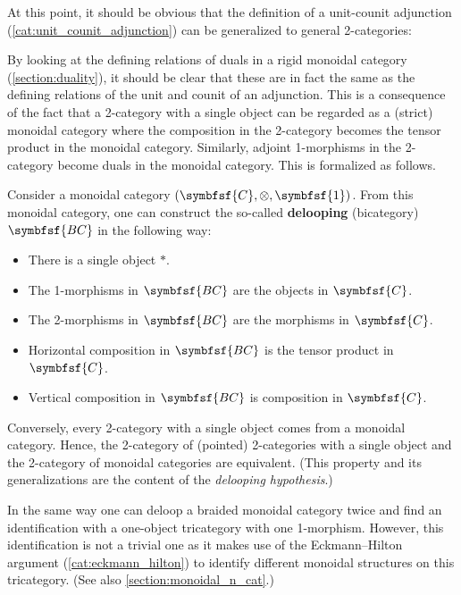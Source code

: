     At this point, it should be obvious that the definition of a unit-counit adjunction (\cref{cat:unit_counit_adjunction}) can be generalized to general 2-categories:

    By looking at the defining relations of duals in a rigid monoidal category (\cref{section:duality}), it should be clear that these are in fact the same as the defining relations of the unit and counit of an adjunction. This is a consequence of the fact that a 2-category with a single object can be regarded as a (strict) monoidal category where the composition in the 2-category becomes the tensor product in the monoidal category. Similarly, adjoint 1-morphisms in the 2-category become duals in the monoidal category. This is formalized as follows.
    \begin{property}\label{cat:monoidal_or_2}
        Consider a monoidal category $(\symbfsf{C},\otimes,\symbfsf{1})$. From this monoidal category, one can construct the so-called \textbf{delooping} (bicategory) $\symbfsf{BC}$ in the following way:
        \begin{itemize}
            \item There is a single object $\ast$.
            \item The 1-morphisms in $\symbfsf{BC}$ are the objects in $\symbfsf{C}$.
            \item The 2-morphisms in $\symbfsf{BC}$ are the morphisms in $\symbfsf{C}$.
            \item Horizontal composition in $\symbfsf{BC}$ is the tensor product in $\symbfsf{C}$.
            \item Vertical composition in $\symbfsf{BC}$ is composition in $\symbfsf{C}$.
        \end{itemize}
        Conversely, every 2-category with a single object comes from a monoidal category. Hence, the 2-category of (pointed) 2-categories with a single object and the 2-category of monoidal categories are equivalent. (This property and its generalizations are the content of the \textit{delooping hypothesis}.)

        In the same way one can deloop a braided monoidal category twice and find an identification with a one-object tricategory with one 1-morphism. However, this identification is not a trivial one as it makes use of the Eckmann--Hilton argument (\cref{cat:eckmann_hilton}) to identify different monoidal structures on this tricategory. (See also \cref{section:monoidal_n_cat}.)
    \end{property}

